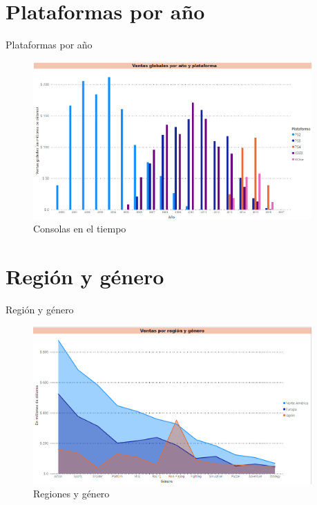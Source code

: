 \documentclass{beamer}
\begin{document}
	\section{Plataformas por año}
	\begin{frame}{Plataformas por año}
		\begin{figure}
			\centering
			\includegraphics[width=4.2in]{m2.png}
			\caption{Consolas en el tiempo}
		\end{figure}
	\end{frame}
	
	\section{Región y género}
	\begin{frame}{Región y género}
		\begin{figure}
			\centering
			\includegraphics[width=4.2in]{m3.png}
			\caption{Regiones y género}
		\end{figure}
	\end{frame}
	
\end{document}

